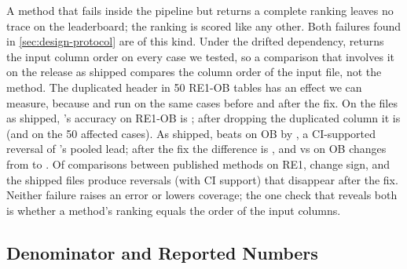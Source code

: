 A method that fails inside the pipeline but returns a complete ranking leaves no trace on the leaderboard; the ranking is scored like any other.
Both failures found in \cref{sec:design-protocol} are of this kind.
Under the drifted dependency, \causalrca returns the input column order on every case we tested, so a comparison that involves it on the release as shipped compares the column order of the input file, not the method.
The duplicated header in 50 RE1-OB tables has an effect we can measure, because \circa and \ediag run on the same cases before and after the fix.
On the files as shipped, \circa's accuracy on RE1-OB is \DefCircaShipped; after dropping the duplicated column it is \DefCircaFixed (\DefCircaShippedAff and \DefCircaFixedAff on the 50 affected cases).
As shipped, \causalrca beats \circa on OB by \DefCrCircaShipped \DefCrCircaShippedCI, a CI-supported reversal of \circa's pooled lead; after the fix the difference is \DefCrCircaFixed \DefCrCircaFixedCI, and \circa vs \rcd on OB changes from \DefCircaRcdShipped to \DefCircaRcdFixed.
Of \DefPubComp comparisons between published methods on RE1, \DefPubSign change sign, and the shipped files produce \DefPubRevShipOnly reversals (\DefPubRevCIShipOnly with CI support) that disappear after the fix.
Neither failure raises an error or lowers coverage; the one check that reveals both is whether a method's ranking equals the order of the input columns.

\subsection{Denominator and Reported Numbers}
\label{sec:rq2-denominator}

